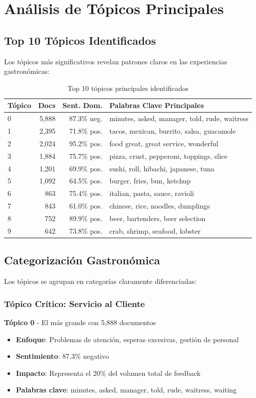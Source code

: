 \documentclass[12pt,a4paper,twoside,openany]{book}
\begin{document}
\section{Análisis de Tópicos Principales}

\subsection{Top 10 Tópicos Identificados}

Los tópicos más significativos revelan patrones claros en las experiencias gastronómicas:

\begin{table}[H]
\centering
\caption{Top 10 tópicos principales identificados}
\begin{tabular}{@{}lrrl@{}}
\toprule
\textbf{Tópico} & \textbf{Docs} & \textbf{Sent. Dom.} & \textbf{Palabras Clave Principales} \\
\midrule
0 & 5,888 & 87.3\% neg. & minutes, asked, manager, told, rude, waitress \\
1 & 2,395 & 71.8\% pos. & tacos, mexican, burrito, salsa, guacamole \\
2 & 2,024 & 95.2\% pos. & food great, great service, wonderful \\
3 & 1,884 & 75.7\% pos. & pizza, crust, pepperoni, toppings, slice \\
4 & 1,201 & 69.9\% pos. & sushi, roll, hibachi, japanese, tuna \\
5 & 1,092 & 64.5\% pos. & burger, fries, bun, ketchup \\
6 & 863 & 75.4\% pos. & italian, pasta, sauce, ravioli \\
7 & 843 & 61.0\% pos. & chinese, rice, noodles, dumplings \\
8 & 752 & 89.9\% pos. & beer, bartenders, beer selection \\
9 & 642 & 73.8\% pos. & crab, shrimp, seafood, lobster \\
\bottomrule
\end{tabular}
\end{table}

\subsection{Categorización Gastronómica}

Los tópicos se agrupan en categorías claramente diferenciadas:

\subsubsection{Tópico Crítico: Servicio al Cliente}
\textbf{Tópico 0} - El más grande con 5,888 documentos
\begin{itemize}
    \item \textbf{Enfoque}: Problemas de atención, esperas excesivas, gestión de personal
    \item \textbf{Sentimiento}: 87.3\% negativo
    \item \textbf{Impacto}: Representa el 20\% del volumen total de feedback
    \item \textbf{Palabras clave}: minutes, asked, manager, told, rude, waitress, waiting
\end{itemize}
\end{document}
